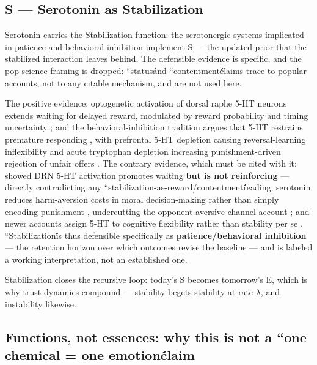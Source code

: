 \documentclass[11pt,twocolumn]{article}
\theoremstyle{plain}
\begin{document}
\subsection{S — Serotonin as Stabilization}

Serotonin carries the Stabilization function: the serotonergic systems implicated in patience and behavioral inhibition implement S — the updated prior that the stabilized interaction leaves behind. The defensible evidence is specific, and the pop-science framing is dropped: ``status\'\' and ``contentment\'\' claims trace to popular accounts, not to any citable mechanism, and are not used here.

The positive evidence: optogenetic activation of dorsal raphe 5-HT neurons extends waiting for delayed reward, modulated by reward probability and timing uncertainty \citep{miyazaki2014,miyazaki2018}; and the behavioral-inhibition tradition argues that 5-HT restrains premature responding \citep{soubrie1986}, with prefrontal 5-HT depletion causing reversal-learning inflexibility \citep{clarke2004} and acute tryptophan depletion increasing punishment-driven rejection of unfair offers \citep{crockett2008}. The contrary evidence, which must be cited with it: \citet{fonseca2015} showed DRN 5-HT activation promotes waiting \textbf{but is not reinforcing} — directly contradicting any ``stabilization-as-reward/contentment\'\' reading; serotonin reduces harm-aversion costs in moral decision-making rather than simply encoding punishment \citep{crockett2015}, undercutting the opponent-aversive-channel account \citep{daw2002}; and newer accounts assign 5-HT to cognitive flexibility rather than stability per se \citep{matias2017}. ``Stabilization\'\' is thus defensible specifically as \textbf{patience/behavioral inhibition} — the retention horizon over which outcomes revise the baseline — and is labeled a working interpretation, not an established one.

Stabilization closes the recursive loop: today's S becomes tomorrow's E, which is why trust dynamics compound — stability begets stability at rate $\lambda$, and instability likewise.

\subsection{Functions, not essences: why this is not a ``one chemical = one emotion\'\' claim}
\end{document}
